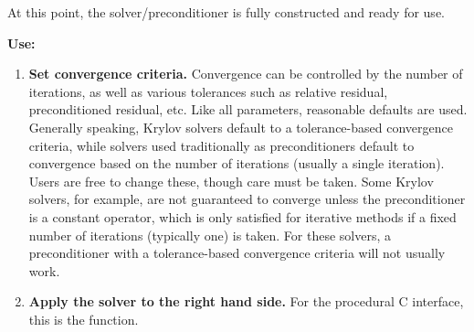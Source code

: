 At this point, the solver/preconditioner is fully constructed and ready for use. 

{\bf Use:}

\begin{enumerate}

\item
{\bf Set convergence criteria.} Convergence can be controlled by the number of iterations,
as well as various tolerances such as relative residual, preconditioned residual, etc.
Like all parameters, reasonable defaults are used. Generally speaking, Krylov solvers
default to a tolerance-based convergence criteria, while solvers used traditionally as
preconditioners default to convergence based on the number of iterations (usually a single
iteration). Users are free to change these, though care must be taken. Some Krylov solvers,
for example, are not guaranteed to converge unless the preconditioner is a constant operator,
which is only satisfied for iterative methods if a fixed number of iterations
(typically one) is taken.
For these solvers, a preconditioner
with a tolerance-based convergence criteria will not usually work.

\item
{\bf Apply the solver to the right hand side.} For the procedural C interface, this is the 
 function. 

\end{enumerate}
